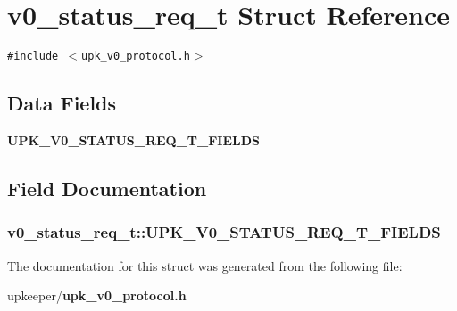 \section{v0\_\-status\_\-req\_\-t Struct Reference}
\label{structv0__status__req__t}
{\tt \#include $<$upk\_\-v0\_\-protocol.h$>$}

\subsection*{Data Fields}
\begin{CompactItemize}
\item 
\bf{UPK\_\-V0\_\-STATUS\_\-REQ\_\-T\_\-FIELDS}
\end{CompactItemize}


\subsection{Field Documentation}
\subsubsection{\setlength{\rightskip}{0pt plus 5cm}\bf{v0\_\-status\_\-req\_\-t::UPK\_\-V0\_\-STATUS\_\-REQ\_\-T\_\-FIELDS}}\label{structv0__status__req__t_10cc186f98ac2b6457e606227ae295ca}




The documentation for this struct was generated from the following file:\begin{CompactItemize}
\item 
upkeeper/\bf{upk\_\-v0\_\-protocol.h}\end{CompactItemize}

